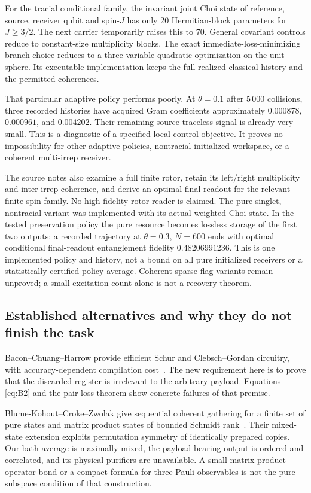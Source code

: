 \documentclass[11pt]{article}
\begin{document}
For the tracial conditional family, the invariant joint Choi state of
reference, source, receiver qubit and spin-$J$ has only 20 Hermitian-block
parameters for $J\ge3/2$. The next carrier temporarily raises this to 70.
General covariant controls reduce to constant-size multiplicity blocks.
The exact immediate-loss-minimizing branch choice reduces to a three-variable
quadratic optimization on the unit sphere. Its executable implementation
keeps the full realized classical history and the permitted coherences.

That particular adaptive policy performs poorly. At $\theta=0.1$ after
$5\,000$ collisions, three recorded histories have acquired Gram
coefficients approximately $0.000878$, $0.000961$, and $0.004202$.
Their remaining source-traceless signal is already very small. This is a
diagnostic of a specified local control objective. It proves no impossibility
for other adaptive policies, nontracial initialized workspace, or a coherent
multi-irrep receiver.

The source notes also examine a full finite rotor, retain its left/right
multiplicity and inter-irrep coherence, and derive an optimal final readout
for the relevant finite spin family. No high-fidelity rotor reader is claimed.
The pure-singlet, nontracial variant was implemented with its actual weighted
Choi state. In the tested preservation policy the pure resource becomes
lossless storage of the first two outputs; a recorded trajectory at
$\theta=0.3$, $N=600$ ends with optimal conditional final-readout entanglement
fidelity $0.48206991236$. This is one implemented policy and history, not a
bound on all pure initialized receivers or a statistically certified policy
average. Coherent sparse-flag variants remain unproved; a small excitation
count alone is not a recovery theorem.

\subsection{Established alternatives and why they do not finish the task}

Bacon--Chuang--Harrow provide efficient Schur and Clebsch--Gordan circuitry,
with accuracy-dependent compilation cost~\cite{bacon}. The new requirement
here is to prove that the discarded register is irrelevant to the arbitrary
payload. Equations \eqref{eq:B2} and the pair-loss theorem show concrete
failures of that premise.

Blume-Kohout--Croke--Zwolak give sequential coherent gathering for a finite
set of pure states and matrix product states of bounded Schmidt
rank~\cite{bcz}. Their mixed-state extension exploits permutation symmetry
of identically prepared copies. Our bath average is maximally mixed, the
payload-bearing output is ordered and correlated, and its physical
purifiers are unavailable. A small matrix-product operator bond or a compact
formula for three Pauli observables is not the pure-subspace condition of
that construction.
\end{document}
